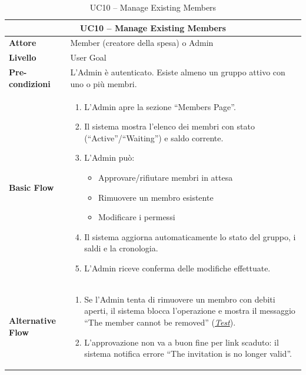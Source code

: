\begin{table}[htbp]
    \centering
    \footnotesize
    \begin{tabularx}{\textwidth}{|l|X|}
        \hline
        \multicolumn{2}{|c|}{\textbf{UC10 -- Manage Existing Members}} \\
        \hline
        \textbf{Attore} & Member (creatore della spesa) o Admin \\
        \hline
        \textbf{Livello} & User Goal \\
        \hline
        \textbf{Pre-condizioni} & L'Admin è autenticato. Esiste almeno un gruppo attivo con uno o più membri. \\
        \hline
        \textbf{Basic Flow} & 
        \begin{enumerate}[leftmargin=*, nosep, topsep=3pt]
            \item L'Admin apre la sezione ``Members Page''.
            \item Il sistema mostra l'elenco dei membri con stato (``Active''/``Waiting'') e saldo corrente.
            \item L'Admin può:
            \begin{itemize}[nosep, label={--}, topsep=2pt]
                \item Approvare/rifiutare membri in attesa
                \item Rimuovere un membro esistente
                \item Modificare i permessi
            \end{itemize}
            \item Il sistema aggiorna automaticamente lo stato del gruppo, i saldi e la cronologia.
            \item L'Admin riceve conferma delle modifiche effettuate.
        \end{enumerate} \\
        \hline
        \textbf{Alternative Flow} & 
        \begin{enumerate}[label=3\alph*., leftmargin=*, nosep, topsep=3pt]
            \item Se l'Admin tenta di rimuovere un membro con debiti aperti, il sistema blocca l'operazione e mostra il messaggio ``The member cannot be removed'' (\hyperref[test:uc10_remove_debt]{\textit{Test}}).
            \item L'approvazione non va a buon fine per link scaduto: il sistema notifica errore ``The invitation is no longer valid''.
        \end{enumerate} \\
        \hline
    \end{tabularx}
    \caption{UC10 -- Manage Existing Members}
    \label{tab:uc10}
\end{table}

